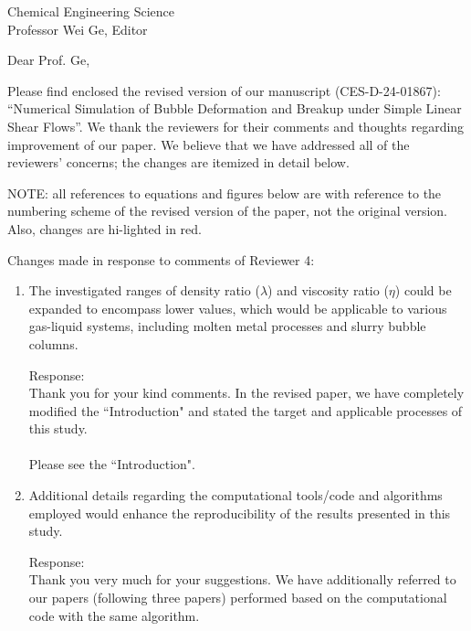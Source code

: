 \documentclass{letter}
\date{\today}
\begin{document}
\begin{letter}{
Chemical Engineering Science\\
Professor Wei Ge, Editor\\}

\opening{Dear Prof. Ge,}

Please find enclosed the revised version of our manuscript (CES-D-24-01867):
``Numerical Simulation of Bubble Deformation and Breakup under 
Simple Linear Shear Flows''.
We thank the reviewers for their comments and thoughts regarding improvement 
of our paper. We believe that we have addressed all of the reviewers’ 
concerns; the changes are itemized in detail below.


\par\noindent
NOTE: all references to equations and figures below are with
reference to the numbering scheme of the revised version of the paper,
not the original version.  Also, changes are hi-lighted in red.
\par\noindent

Changes made in response to comments of Reviewer 4: 
\begin{enumerate}
\item
\textsf
{The investigated ranges of density ratio ($\lambda$) and viscosity ratio ($\eta$) could be expanded to encompass lower values, which 
would be applicable to various gas-liquid systems, including molten metal processes and slurry bubble columns.}
\vspace{3 mm}

Response: \\
Thank you for your kind comments. 
In the revised paper, we have completely modified the ``Introduction" and stated the target and applicable processes of this study.\\
\\
Please see the ``Introduction".
\\

\par\noindent
\item
\textsf
{Additional details regarding the computational tools/code and algorithms employed would enhance the reproducibility of the 
results presented in this study.}
\vspace{3 mm}

Response: \\
Thank you very much for your suggestions.  We have additionally referred to our papers (following three papers) 
performed based on the computational code with the same algorithm.


\end{enumerate}
\end{letter}
\end{document}
